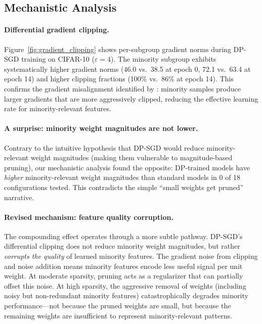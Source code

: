 \documentclass{article}
\begin{document}
\subsection{Mechanistic Analysis}
\label{sec:mechanistic}

\paragraph{Differential gradient clipping.}
Figure~\ref{fig:gradient_clipping} shows per-subgroup gradient norms during DP-SGD training on CIFAR-10 ($\varepsilon = 4$). The minority subgroup exhibits systematically higher gradient norms (46.0 vs.\ 38.5 at epoch 0, 72.1 vs.\ 63.4 at epoch 14) and higher clipping fractions (100\% vs.\ 86\% at epoch 14). This confirms the gradient misalignment identified by \citet{esipova2023disparate}: minority samples produce larger gradients that are more aggressively clipped, reducing the effective learning rate for minority-relevant features.

\paragraph{A surprise: minority weight magnitudes are not lower.}
Contrary to the intuitive hypothesis that DP-SGD would reduce minority-relevant weight magnitudes (making them vulnerable to magnitude-based pruning), our mechanistic analysis found the opposite: DP-trained models have \emph{higher} minority-relevant weight magnitudes than standard models in 0 of 18 configurations tested. This contradicts the simple ``small weights get pruned'' narrative.

\paragraph{Revised mechanism: feature quality corruption.}
The compounding effect operates through a more subtle pathway. DP-SGD's differential clipping does not reduce minority weight magnitudes, but rather \emph{corrupts the quality} of learned minority features. The gradient noise from clipping and noise addition means minority features encode less useful signal per unit weight. At moderate sparsity, pruning acts as a regularizer that can partially offset this noise. At high sparsity, the aggressive removal of weights (including noisy but non-redundant minority features) catastrophically degrades minority performance---not because the pruned weights are small, but because the remaining weights are insufficient to represent minority-relevant patterns.
\end{document}
